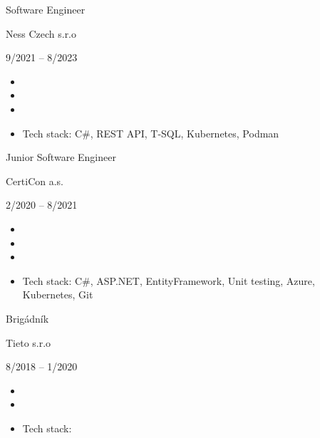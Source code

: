 \documentclass[a4paper]{article}
\newcommand{\experience}[4]{
    \begin{minipage}{\linewidth}
    \begin{large}
    \begin{bfseries}
    #1
    \end{bfseries}
    \end{large}

    \begin{large}
        \begin{bfseries}
        \noindent #2
        \end{bfseries}
        \hfill #3 
    \end{large}

    \begin{itemize}
    #4
    \end{itemize}
    \end{minipage}
    \vspace{\mypadding}
}
\newlength{\mypadding}
\newif\ifenglish
\newif\ifczech
\begin{document}
\experience{Software Engineer}{Ness Czech s.r.o}{9/2021 -- 8/2023}{
\item
    \ifenglish Developed a REST API for Vodafone a.s., including desing and implementation.\fi
    \ifczech Vývoj REST API pro Vodafone a.s., včetně návrhu a implementace.\fi

\item
    \ifenglish Designed and managed deployment pipeline, ensuring reliable releases.\fi
    \ifczech Návrh a správa deployment pipeline pro zajištění spolehlivého nasazení.\fi

\item
    \ifenglish Implemented a database-oriented application with emphasis on performance and data integrity.\fi
    \ifczech Implementace databázově orientované aplikace s důrazem na výkon a datovou integritu.\fi

\item
    Tech stack: C\#, REST API, T-SQL, Kubernetes, Podman
}
    
\experience{Junior Software Engineer}{CertiCon a.s.}{2/2020 -- 8/2021}{
\item
    \ifenglish Implemented and maintained information system solution for a Medtronic company.\fi
    \ifczech Náš tým implementoval a udržoval informační systém pro společnost Medtronik.\fi

\item
    \ifenglish Refactored parts of an old and unscalable project into microservices.\fi
    \ifczech Refactor částí staré a neškálovatelné aplikace do mikroservis.\fi

\item
    \ifenglish Added unit tests to the existing solution to improve reliability.\fi
    \ifczech Doplňování unit testů do původního projektu za účelem zvýšení spolehlivosti.\fi

\item
    Tech stack: C\#, ASP.NET, EntityFramework, Unit testing, Azure, Kubernetes, Git
}

\experience{\ifenglish Part-time worker\fi\ifczech Brigádník\fi}{Tieto s.r.o}{8/2018 -- 1/2020}{
\item
    \ifenglish Supporting work in administration and resource monitoring.\fi
    \ifczech Podpůrné práce v administrativě a monitoringu zdrojů.\fi

\item
    \ifenglish Later, automation of server maintenance.\fi
    \ifczech Později, automatizace správy serverů.\fi

\item
    Tech stack: 
    \ifenglish Bash, PowerShell, Linux, Atlassian ecosystem.\fi
    \ifczech Bash, PowerShell, Linux, Atlassian ekosystém.\fi
}
\end{document}
